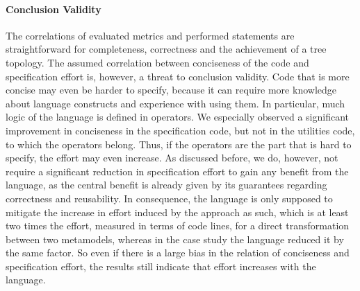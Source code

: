 
\paragraph{Conclusion Validity}
The correlations of evaluated metrics and performed statements are straightforward for completeness, correctness and the achievement of a tree topology.
The assumed correlation between conciseness of the code and specification effort is, however, a threat to conclusion validity.
Code that is more concise may even be harder to specify, because it can require more knowledge about language constructs and experience with using them.
In particular, much logic of the \commonalities language is defined in operators.
We especially observed a significant improvement in conciseness in the specification code, but not in the utilities code, to which the operators belong.
Thus, if the operators are the part that is hard to specify, the effort may even increase.
As discussed before, we do, however, not require a significant reduction in specification effort to gain any benefit from the \commonalities language, as the central benefit is already given by its guarantees regarding correctness and reusability.
In consequence, the language is only supposed to mitigate the increase in effort induced by the \commonalities approach as such, which is at least two times the effort, measured in terms of code lines, for a direct transformation between two metamodels, whereas in the case study the language reduced it by the same factor.
So even if there is a large bias in the relation of conciseness and specification effort, the results still indicate that effort increases with the \commonalities language.

